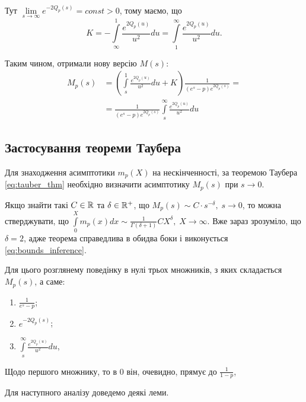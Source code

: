 Тут $\lim\limits_{s\rightarrow \infty} e^{- 2Q_p(s)} = const > 0$, тому маємо, що
\begin{equation}
	K = -  \int\limits_\infty^1 \frac{e^{2Q_p(u)}}{u^2} du =  \int\limits_1^\infty \frac{e^{2Q_p(u)}}{u^2} du.
\end{equation}

Таким чином, отримали нову версію $M(s)$:
\begin{equation}
\begin{split}
	\label{eq:uniform_right_laplace_sol}
	M_p(s)&= \left( \int\limits_s^1 \frac{e^{2Q_p(u)}}{u^2} du + K \right) \frac{1}{(e^s - p)  e^{2Q_p(s)}}
 = \\
	&=\frac{1}{(e^s - p)  e^{2Q_p(s)}} \int\limits_s^\infty \frac{e^{2Q_p(u)}}{u^2} du
\end{split}
\end{equation}

\subsection{Застосування теореми Таубера}

Для знаходження асимптотики $m_p(X)$ на нескінченності, за теоремою Таубера \eqref{eq:tauber_thm} необхідно визначити асимптотику $M_p(s)$ при $s \rightarrow 0$.

Якщо знайти такі $C \in \mathbb{R}$ та $\delta \in \mathbb{R}^+$, що $M_p(s) \sim C \cdot s^{-\delta}, \; s \rightarrow 0$, то можна стверджувати, що $\int\limits_0^X m_p(x) dx \sim \frac{1}{\Gamma(\delta + 1)} C X^\delta, \; X \rightarrow \infty$. Вже зараз зрозуміло, що $\delta = 2$, адже теорема справедлива в обидва боки і виконується \eqref{eq:bounds_inference}.

Для цього розглянему поведінку в нулі трьох множників, з яких складається $M_p(s)$, а саме:
\begin{enumerate}
	\item $\frac{1}{e^s - p}$;
	\item $e^{-2Q_p(s)}$;
	\item $\int\limits_s^\infty \frac{e^{2Q_p(u)}}{u^2} du$,
\end{enumerate}

Щодо першого множнику, то в 0 він, очевидно, прямує до $\frac{1}{1-p}$,

Для наступного аналізу доведемо деякі леми.

